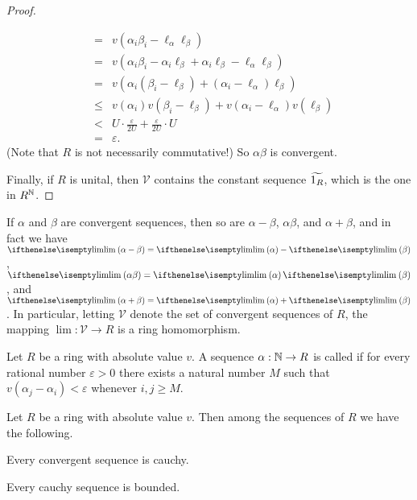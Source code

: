 \begin{proof}
\begin{inlineproplist}
\begin{eqnarray*}
 & = & v(\alpha_i\beta_i - \ell_\alpha \ell_\beta) \\
 & = & v(\alpha_i\beta_i - \alpha_i \ell_\beta + \alpha_i \ell_\beta - \ell_\alpha \ell_\beta) \\
 & = & v\left( \alpha_i(\beta_i - \ell_\beta) + (\alpha_i - \ell_\alpha)\ell_\beta \right) \\
 & \leq & v(\alpha_i)v(\beta_i - \ell_\beta) + v(\alpha_i - \ell_\alpha)v(\ell_\beta) \\
 & < & U \cdot \frac{\varepsilon}{2U} + \frac{\varepsilon}{2U} \cdot U \\
 & = & \varepsilon.
\end{eqnarray*}
(Note that \(R\) is not necessarily commutative!) So \(\alpha\beta\) is convergent.
\end{inlineproplist}
Finally, if \(R\) is unital, then \(\mathcal{V}\) contains the constant sequence \(\widetilde{1_R}\), which is the one in \(R^{\mathbb{N}}\).
\end{proof}

\begin{cor}
If \(\alpha\) and \(\beta\) are convergent sequences, then so are \(\alpha - \beta\), \(\alpha \beta\), and \(\alpha + \beta\), and in fact we have \(\LIM{\alpha - \beta} = \LIM{\alpha} - \LIM{\beta}\), \(\LIM{\alpha\beta} = \LIM{\alpha}\LIM{\beta}\), and \(\LIM{\alpha + \beta} = \LIM{\alpha} + \LIM{\beta}\). In particular, letting \(\mathcal{V}\) denote the set of convergent sequences of \(R\), the mapping \(\lim : \mathcal{V} \rightarrow R\) is a ring homomorphism.
\end{cor}

\begin{dfn}
Let \(R\) be a ring with absolute value \(v\). A sequence \(\alpha : \mathbb{N} \rightarrow R\) is called  if for every rational number \(\varepsilon > 0\) there exists a natural number \(M\) such that \(v(\alpha_j - \alpha_i) < \varepsilon\) whenever \(i,j \geq M\).
\end{dfn}

\begin{prop} \label{prop:cauchy-seq-subset}
Let \(R\) be a ring with absolute value \(v\). Then among the sequences of \(R\) we have the following.
\begin{proplist}
\item Every convergent sequence is cauchy. \label{prop:cauchy-seq-subset:convergent}
\item Every cauchy sequence is bounded. \label{prop:cauchy-seq-subset:bounded}
\end{proplist}
\end{prop}

